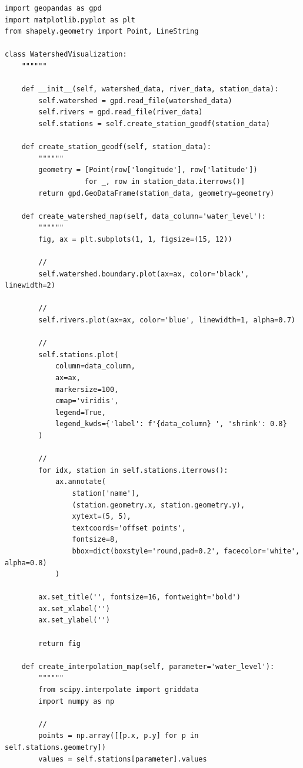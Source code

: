 \begin{lstlisting}[style=python]
import geopandas as gpd
import matplotlib.pyplot as plt
from shapely.geometry import Point, LineString

class WatershedVisualization:
    """"""
    
    def __init__(self, watershed_data, river_data, station_data):
        self.watershed = gpd.read_file(watershed_data)
        self.rivers = gpd.read_file(river_data)
        self.stations = self.create_station_geodf(station_data)
    
    def create_station_geodf(self, station_data):
        """"""
        geometry = [Point(row['longitude'], row['latitude']) 
                   for _, row in station_data.iterrows()]
        return gpd.GeoDataFrame(station_data, geometry=geometry)
    
    def create_watershed_map(self, data_column='water_level'):
        """"""
        fig, ax = plt.subplots(1, 1, figsize=(15, 12))
        
        // 
        self.watershed.boundary.plot(ax=ax, color='black', linewidth=2)
        
        // 
        self.rivers.plot(ax=ax, color='blue', linewidth=1, alpha=0.7)
        
        // 
        self.stations.plot(
            column=data_column,
            ax=ax,
            markersize=100,
            cmap='viridis',
            legend=True,
            legend_kwds={'label': f'{data_column} ', 'shrink': 0.8}
        )
        
        // 
        for idx, station in self.stations.iterrows():
            ax.annotate(
                station['name'],
                (station.geometry.x, station.geometry.y),
                xytext=(5, 5),
                textcoords='offset points',
                fontsize=8,
                bbox=dict(boxstyle='round,pad=0.2', facecolor='white', alpha=0.8)
            )
        
        ax.set_title('', fontsize=16, fontweight='bold')
        ax.set_xlabel('')
        ax.set_ylabel('')
        
        return fig
    
    def create_interpolation_map(self, parameter='water_level'):
        """"""
        from scipy.interpolate import griddata
        import numpy as np
        
        // 
        points = np.array([[p.x, p.y] for p in self.stations.geometry])
        values = self.stations[parameter].values
        

\end{lstlisting}
